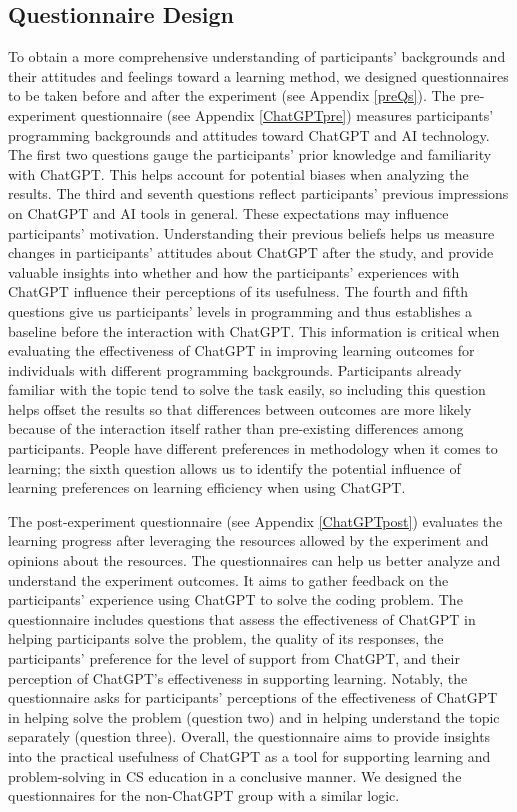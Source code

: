 \documentclass[manuscript,screen,nonacm]{acmart}
\begin{document}
\subsection{Questionnaire Design}
To obtain a more comprehensive understanding of participants' backgrounds and their attitudes and feelings toward a learning method, we designed questionnaires to be taken before and after the experiment (see Appendix \ref{preQs}). The pre-experiment questionnaire (see Appendix \ref{ChatGPTpre}) measures participants' programming backgrounds and attitudes toward ChatGPT and AI technology. The first two questions gauge the participants' prior knowledge and familiarity with ChatGPT. This helps account for potential biases when analyzing the results. The third and seventh questions reflect participants' previous impressions on ChatGPT and AI tools in general. These expectations may influence participants' motivation. Understanding their previous beliefs helps us measure changes in participants' attitudes about ChatGPT after the study, and provide valuable insights into whether and how the participants' experiences with ChatGPT influence their perceptions of its usefulness. The fourth and fifth questions give us participants' levels in programming and thus establishes a baseline before the interaction with ChatGPT. This information is critical when evaluating the effectiveness of ChatGPT in improving learning outcomes for individuals with different programming backgrounds. Participants already familiar with the topic tend to solve the task easily, so including this question helps offset the results so that differences between outcomes are more likely because of the interaction itself rather than pre-existing differences among participants. People have different preferences in methodology when it comes to learning; the sixth question allows us to identify the potential influence of learning preferences on learning efficiency when using ChatGPT. 

The post-experiment questionnaire (see Appendix \ref{ChatGPTpost}) evaluates the learning progress after leveraging the resources allowed by the experiment and opinions about the resources. The questionnaires can help us better analyze and understand the experiment outcomes. It aims to gather feedback on the participants' experience using ChatGPT to solve the coding problem. The questionnaire includes questions that assess the effectiveness of ChatGPT in helping participants solve the problem, the quality of its responses, the participants' preference for the level of support from ChatGPT, and their perception of ChatGPT's effectiveness in supporting learning. Notably, the questionnaire asks for participants' perceptions of the effectiveness of ChatGPT in helping solve the problem (question two) and in helping understand the topic separately (question three). Overall, the questionnaire aims to provide insights into the practical usefulness of ChatGPT as a tool for supporting learning and problem-solving in CS education in a conclusive manner. We designed the questionnaires for the non-ChatGPT group with a similar logic.
\end{document}
